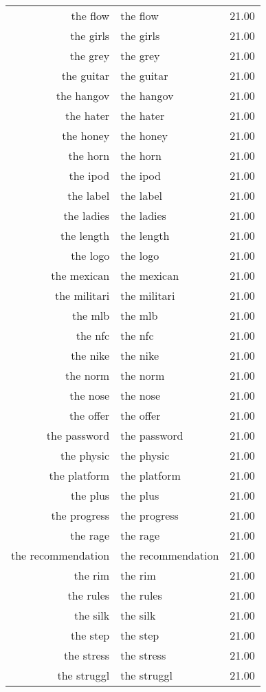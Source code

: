 \begin{table}[ht]
\begin{tabular}{rlr}
  the flow & the flow & 21.00 \\ 
  the girls & the girls & 21.00 \\ 
  the grey & the grey & 21.00 \\ 
  the guitar & the guitar & 21.00 \\ 
  the hangov & the hangov & 21.00 \\ 
  the hater & the hater & 21.00 \\ 
  the honey & the honey & 21.00 \\ 
  the horn & the horn & 21.00 \\ 
  the ipod & the ipod & 21.00 \\ 
  the label & the label & 21.00 \\ 
  the ladies & the ladies & 21.00 \\ 
  the length & the length & 21.00 \\ 
  the logo & the logo & 21.00 \\ 
  the mexican & the mexican & 21.00 \\ 
  the militari & the militari & 21.00 \\ 
  the mlb & the mlb & 21.00 \\ 
  the nfc & the nfc & 21.00 \\ 
  the nike & the nike & 21.00 \\ 
  the norm & the norm & 21.00 \\ 
  the nose & the nose & 21.00 \\ 
  the offer & the offer & 21.00 \\ 
  the password & the password & 21.00 \\ 
  the physic & the physic & 21.00 \\ 
  the platform & the platform & 21.00 \\ 
  the plus & the plus & 21.00 \\ 
  the progress & the progress & 21.00 \\ 
  the rage & the rage & 21.00 \\ 
  the recommendation & the recommendation & 21.00 \\ 
  the rim & the rim & 21.00 \\ 
  the rules & the rules & 21.00 \\ 
  the silk & the silk & 21.00 \\ 
  the step & the step & 21.00 \\ 
  the stress & the stress & 21.00 \\ 
  the struggl & the struggl & 21.00 \\ 

\end{tabular}
\end{table}
